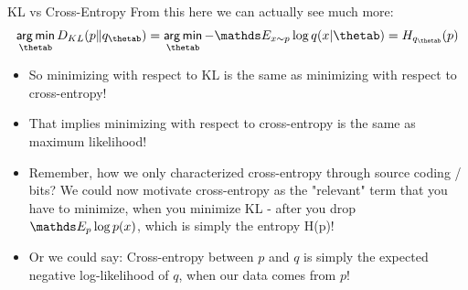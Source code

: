 \begin{vbframe}{KL vs Cross-Entropy}
From this here we can actually see much more:
$$ \argmin_{\thetab} D_{KL}(p \| q_{\thetab}) = \argmin_{\thetab} -\E_{x \sim p} \log q(x|\thetab) = H_{q_{\thetab}}(p) $$
  \begin{itemize}
    \item So minimizing with respect to KL is the same as minimizing with respect to cross-entropy! 
    \item That implies minimizing with respect to cross-entropy is the same as maximum likelihood!
    \item Remember, how we only characterized cross-entropy through source coding / bits? We could now motivate cross-entropy as the "relevant" term that you have to minimize, when you minimize KL - after you drop $\E_p \log p(x)$, which is simply the entropy H(p)!
    \item Or we could say: Cross-entropy between $p$ and $q$ is simply the expected negative log-likelihood of $q$, when our data comes from $p$!
  \end{itemize}
\end{vbframe}

